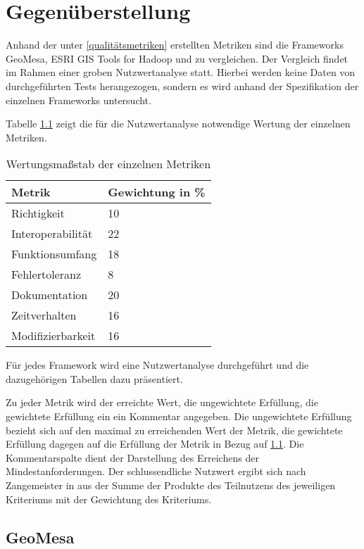 \chapter{Gegenüberstellung}

Anhand der unter \ref{qualitätsmetriken} erstellten Metriken sind die Frameworks GeoMesa, ESRI GIS Tools for Hadoop und  zu vergleichen.
Der Vergleich findet im Rahmen einer groben Nutzwertanalyse statt.
Hierbei werden keine Daten von durchgeführten Tests herangezogen, sondern es wird anhand der Spezifikation der einzelnen Frameworks untersucht.


Tabelle \ref{table:Wertungsmassstab} zeigt die für die Nutzwertanalyse notwendige Wertung der einzelnen Metriken.
\begin{table}[h]
\centering
\begin{tabular}{l|l}
\textbf{Metrik} & \textbf{Gewichtung in \%} \\ \hline
Richtigkeit & 10 \\ \hline
Interoperabilität & 22 \\ \hline
Funktionsumfang & 18 \\ \hline
Fehlertoleranz & 8 \\ \hline
Dokumentation & 20 \\ \hline
Zeitverhalten & 16 \\ \hline
Modifizierbarkeit & 16
\end{tabular}
\caption{Wertungsmaßstab der einzelnen Metriken}
\label{table:Wertungsmassstab}
\end{table}

Für jedes Framework wird eine Nutzwertanalyse durchgeführt und die dazugehörigen Tabellen dazu präsentiert.

Zu jeder Metrik wird der erreichte Wert, die ungewichtete Erfüllung, die gewichtete Erfüllung ein ein Kommentar angegeben.
Die ungewichtete Erfüllung bezieht sich auf den maximal zu erreichenden Wert der Metrik, die gewichtete Erfüllung dagegen auf die Erfüllung der Metrik in Bezug auf \ref{table:Wertungsmassstab}.
Die Kommentarspalte dient der Darstellung des Erreichens der Mindestanforderungen.
Der schlussendliche Nutzwert ergibt sich nach Zangemeister in \cite{website:nutzwertanalyse} aus der Summe der Produkte des Teilnutzens des jeweiligen Kriteriums mit der Gewichtung des Kriteriums.

\section{GeoMesa}

